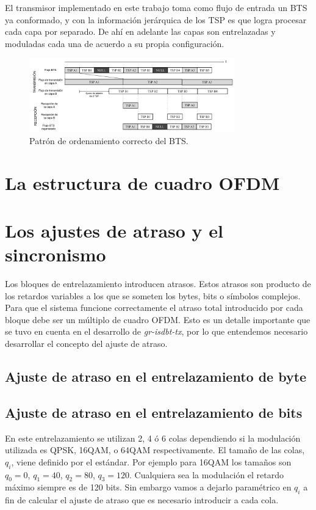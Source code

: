 \documentclass[journal,comsoc]{IEEEtran}
\begin{document}
El transmisor implementado en este trabajo toma como flujo de entrada un
BTS ya conformado, y con la información jerárquica de los TSP es que logra
procesar cada capa por separado. De ahí en adelante las capas son entrelazadas y moduladas cada una de acuerdo a su propia configuración.

\begin{figure}[!h]
\centering
\includegraphics[width=3.5in]{figuras/bts2}
\caption{Patrón de ordenamiento correcto del BTS.}
\label{bts2}
\end{figure}

\section{La estructura de cuadro OFDM}

\section{Los ajustes de atraso y el sincronismo}
Los bloques de entrelazamiento introducen atrasos. Estos atrasos son producto de los retardos variables a los que se someten los bytes, bits o símbolos complejos. Para que el sistema funcione correctamente el atraso total introducido por cada bloque debe ser un múltiplo de cuadro OFDM. Esto es un detalle importante que se tuvo en cuenta en el desarrollo de \textit{gr-isdbt-tx}, por lo que entendemos necesario desarrollar el concepto del ajuste de atraso.


\subsection{Ajuste de atraso en el entrelazamiento de byte}


\subsection{Ajuste de atraso en el entrelazamiento de bits}
En este entrelazamiento se utilizan 2, 4 ó 6 colas dependiendo si la modulación utilizada es QPSK, 16QAM, o 64QAM respectivamente. El tamaño de las colas, $q_i$, viene definido por el estándar. Por ejemplo para 16QAM los tamaños son $q_0 = 0$, $q_1 = 40$, $q_2 = 80$, $q_3 = 120$. Cualquiera sea la modulación el retardo máximo siempre es de 120 bits. Sin embargo vamos a dejarlo paramétrico en $q_i$ a fin de calcular el ajuste de atraso que es necesario introducir a cada cola.
\end{document}
